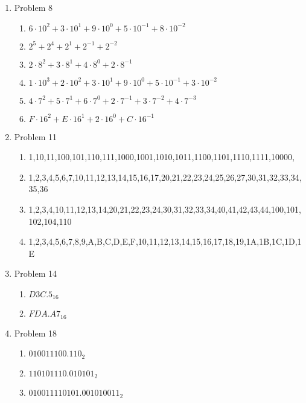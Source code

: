 \begin{enumerate}[leftmargin=2cm,labelsep=.5cm,label=\bf\arabic*.]

\item Problem 8
\begin{enumerate}
  \item $6 \cdot 10^2 + 3 \cdot 10^1 + 9 \cdot 10^0 + 5 \cdot 10^{-1} + 8 \cdot 10^{-2}$
  \item $2^5 + 2^4 + 2^1 + 2^{-1} + 2^{-2}$
  \item $2 \cdot 8^2 + 3 \cdot 8^1 + 4 \cdot 8^0 + 2 \cdot 8^{-1}$
  \item $1 \cdot 10^3 + 2 \cdot 10^2 + 3 \cdot 10^1 + 9 \cdot 10^0 + 5 \cdot 10^{-1} + 3 \cdot 10^{-2}$
  \item $4 \cdot 7^2 + 5 \cdot 7^1 + 6 \cdot 7^0 + 2 \cdot 7^{-1} + 3 \cdot 7^{-2} + 4 \cdot 7^{-3}$
  \item $F \cdot 16^2 + E \cdot 16^1 + 2 \cdot 16^0 + C \cdot 16^{-1}$
\end{enumerate}

\item Problem 11
\begin{enumerate}
  \item 1,10,11,100,101,110,111,1000,1001,1010,1011,1100,1101,1110,1111,10000,
  \item 1,2,3,4,5,6,7,10,11,12,13,14,15,16,17,20,21,22,23,24,25,26,27,30,31,32,33,34,35,36
  \item 1,2,3,4,10,11,12,13,14,20,21,22,23,24,30,31,32,33,34,40,41,42,43,44,100,101,102,104,110
  \item 1,2,3,4,5,6,7,8,9,A,B,C,D,E,F,10,11,12,13,14,15,16,17,18,19,1A,1B,1C,1D,1E
\end{enumerate}

\item Problem 14
\begin{enumerate}
  \item $D3C.5_{16}$
  \item $FDA.A7_{16}$
\end{enumerate}

\item Problem 18
\begin{enumerate}
  \item $010011100.110_2$
  \item $110101110.010101_2$
  \item $010011110101.001010011_2$
\end{enumerate}


\end{enumerate}
